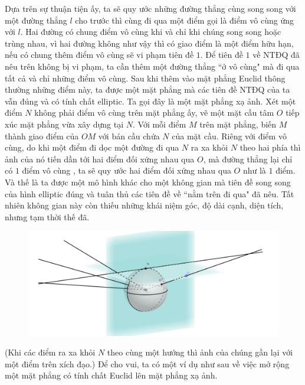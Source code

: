 \begin{multicols}{2}
	\vskip 0.1cm
	Dựa trên sự thuận tiện ấy, ta sẽ quy ước những đường thẳng cùng song song với một đường thẳng $l$ cho trước thì cùng đi qua một điểm gọi là điểm vô cùng ứng với $l$. Hai đường có chung điểm vô cùng khi và chỉ khi chúng song song hoặc trùng nhau, vì hai đường không như vậy thì có giao điểm là một điểm hữu hạn, nếu có chung thêm điểm vô cùng sẽ vi phạm tiên đề $1$. Để tiên đề $1$ về NTĐQ đã nêu trên không bị vi phạm, ta cần thêm một đường thẳng ``ở vô cùng" mà đi qua tất cả và chỉ những điểm vô cùng. Sau khi thêm vào mặt phẳng Euclid thông thường những điểm này, ta được một mặt phẳng mà các tiên đề NTĐQ của ta vẫn đúng và có tính chất elliptic. Ta gọi đây là một mặt phẳng xạ ảnh.
	\vskip 0.1cm
	Xét một điểm $N$ không phải điểm vô cùng trên mặt phẳng ấy, vẽ một mặt cầu tâm $O$ tiếp xúc mặt phẳng vừa xây dựng tại $N$. Với mỗi điểm $M$ trên mặt phẳng, biến $M$ thành giao điểm của $OM$ với bán cầu chứa $N$ của mặt cầu. Riêng với điểm vô cùng, do khi một điểm đi dọc một đường đi qua $N$ ra xa khỏi $N$ theo hai phía thì ảnh của nó tiến dần tới hai điểm đối xứng nhau qua $O$, mà đường thẳng lại chỉ có $1$ điểm vô cùng , ta sẽ quy ước hai điểm đối xứng nhau qua $O$ như là $1$ điểm. Và thế là ta được một mô hình khác cho một không gian mà tiên đề song song của hình elliptic đúng và tuân thủ các tiên đề về ``nằm trên đi qua" đã nêu. Tất nhiên không gian này còn thiếu những khái niệm góc, độ dài cạnh, diện tích, nhưng tạm thời thế đã.
	\begin{figure}[H]
		\vspace*{-5pt}
		\centering
		\captionsetup{labelformat= empty, justification=centering}
		\includegraphics[width= 1\linewidth]{Stereographic projection.png}
		\vspace*{-10pt}
	\end{figure}
	(Khi các điểm ra xa khỏi $N$ theo cùng một hướng thì ảnh của chúng gần lại với một điểm trên xích đạo.)
	\vskip 0.1cm
	Để cho vui, ta có một ví dụ như sau về việc mở rộng một mặt phẳng có tính chất Euclid lên mặt phẳng xạ ảnh.

\end{multicols}
